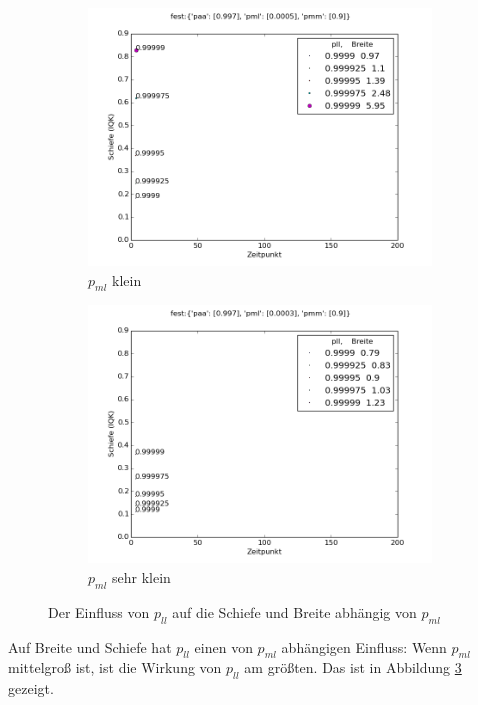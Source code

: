 \begin{figure}
\begin{subfigure}[b]{0.49\textwidth}
\includegraphics[width=\textwidth]{bilder/pll/3fest_09_00005_0997_p}
\caption{$p_{ml}$ klein}
\label{einfluss_pll_pml-}
\end{subfigure}
\begin{subfigure}[b]{0.49\textwidth}
\includegraphics[width=\textwidth]{bilder/pll/3fest_09_00003_0997_p}
\caption{$p_{ml}$ sehr klein}
\label{einfluss_pll_pml--}
\end{subfigure}
\caption{Der Einfluss von $p_{ll}$ auf die Schiefe und Breite abhängig von $p_{ml}$}
\label{einfluss_pll_pml}
\end{figure}

Auf Breite und Schiefe hat $p_{ll}$ einen von $p_{ml}$ abhängigen Einfluss: Wenn $p_{ml}$ mittelgroß ist, ist die Wirkung von $p_{ll}$ am größten. Das ist in Abbildung \ref{einfluss_pll_pml} gezeigt.


